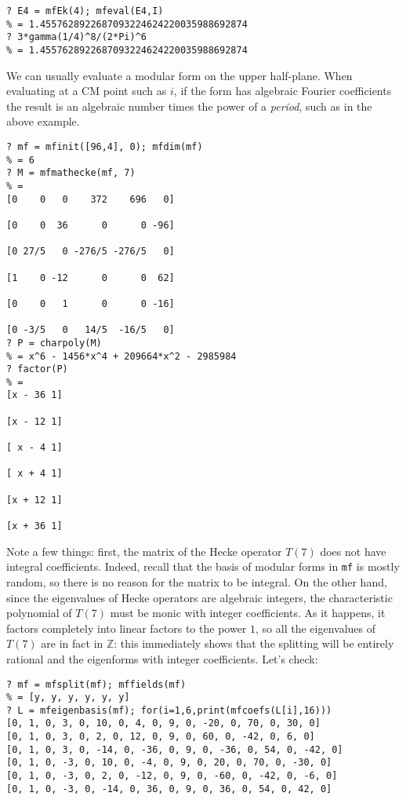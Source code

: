 \documentclass[11pt]{article}
\newcommand{\Z}{{\mathbb Z}}
\def\kbd#1{{\tt #1}}
\begin{document}
\medskip

\begin{verbatim}
? E4 = mfEk(4); mfeval(E4,I)
% = 1.4557628922687093224624220035988692874
? 3*gamma(1/4)^8/(2*Pi)^6
% = 1.4557628922687093224624220035988692874
\end{verbatim}

We can usually evaluate a modular form on the upper half-plane. When
evaluating at a CM point such as $i$, if the form has algebraic
Fourier coefficients the result is an algebraic number times the power
of a \emph{period}, such as in the above example.

\medskip

\begin{verbatim}
? mf = mfinit([96,4], 0); mfdim(mf)
% = 6
? M = mfmathecke(mf, 7)
% =
[0    0   0    372    696   0]

[0    0  36      0      0 -96]

[0 27/5   0 -276/5 -276/5   0]

[1    0 -12      0      0  62]

[0    0   1      0      0 -16]

[0 -3/5   0   14/5  -16/5   0]
? P = charpoly(M)
% = x^6 - 1456*x^4 + 209664*x^2 - 2985984
? factor(P)
% =
[x - 36 1]

[x - 12 1]

[ x - 4 1]

[ x + 4 1]

[x + 12 1]

[x + 36 1]
\end{verbatim}

Note a few things: first, the matrix of the Hecke operator $T(7)$ does not
have integral coefficients. Indeed, recall that the basis of modular forms
in \kbd{mf} is mostly random, so there is no reason for the matrix to be
integral. On the other hand, since the eigenvalues of Hecke operators are
algebraic integers, the characteristic polynomial of $T(7)$ must be monic
with integer coefficients. As it happens, it factors completely into
linear factors to the power $1$, so all the eigenvalues of $T(7)$ are in
fact in $\Z$: this immediately shows that the splitting will be entirely
rational and the eigenforms with integer coefficients. Let's check:

\begin{verbatim}
? mf = mfsplit(mf); mffields(mf)
% = [y, y, y, y, y, y]
? L = mfeigenbasis(mf); for(i=1,6,print(mfcoefs(L[i],16)))
[0, 1, 0, 3, 0, 10, 0, 4, 0, 9, 0, -20, 0, 70, 0, 30, 0]
[0, 1, 0, 3, 0, 2, 0, 12, 0, 9, 0, 60, 0, -42, 0, 6, 0]
[0, 1, 0, 3, 0, -14, 0, -36, 0, 9, 0, -36, 0, 54, 0, -42, 0]
[0, 1, 0, -3, 0, 10, 0, -4, 0, 9, 0, 20, 0, 70, 0, -30, 0]
[0, 1, 0, -3, 0, 2, 0, -12, 0, 9, 0, -60, 0, -42, 0, -6, 0]
[0, 1, 0, -3, 0, -14, 0, 36, 0, 9, 0, 36, 0, 54, 0, 42, 0]
\end{verbatim}
\end{document}
